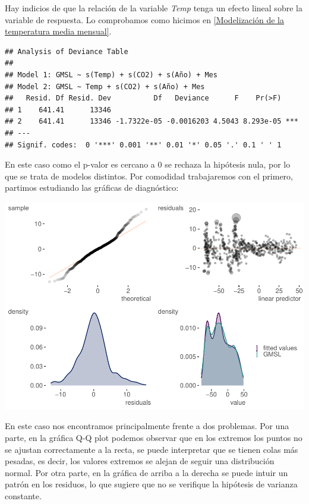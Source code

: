 \documentclass[12pt,a4paper,]{book}
\numberwithin{dummy}{section}
\theoremstyle{ocrenumbox}
\theoremstyle{blacknumex}
\theoremstyle{blacknumbox}
\theoremstyle{ocrenum}
\theoremstyle{ocrenum}
\begin{document}
Hay indicios de que la relación de la variable \emph{Temp} tenga un
efecto lineal sobre la variable de respuesta. Lo comprobamos como
hicimos en \ref{Modelización de la temperatura media mensual}.

\begin{verbatim}
## Analysis of Deviance Table
## 
## Model 1: GMSL ~ s(Temp) + s(CO2) + s(Año) + Mes
## Model 2: GMSL ~ Temp + s(CO2) + s(Año) + Mes
##   Resid. Df Resid. Dev          Df   Deviance      F    Pr(>F)    
## 1    641.41      13346                                            
## 2    641.41      13346 -1.7322e-05 -0.0016203 4.5043 8.293e-05 ***
## ---
## Signif. codes:  0 '***' 0.001 '**' 0.01 '*' 0.05 '.' 0.1 ' ' 1
\end{verbatim}

En este caso como el p-valor es cercano a 0 se rechaza la hipótesis
nula, por lo que se trata de modelos distintos. Por comodidad
trabajaremos con el primero, partimos estudiando las gráficas de
diagnóstico:

\begin{center}\includegraphics[width=0.95\linewidth]{figurasR/unnamed-chunk-40-1} \end{center}

En este caso nos encontramos principalmente frente a dos problemas. Por
una parte, en la gráfica Q-Q plot podemos observar que en los extremos
los puntos no se ajustan correctamente a la recta, se puede interpretar
que se tienen colas más pesadas, es decir, los valores extremos se
alejan de seguir una distribución normal. Por otra parte, en la gráfica
de arriba a la derecha se puede intuir un patrón en los residuos, lo que
sugiere que no se verifique la hipótesis de varianza constante.
\end{document}
